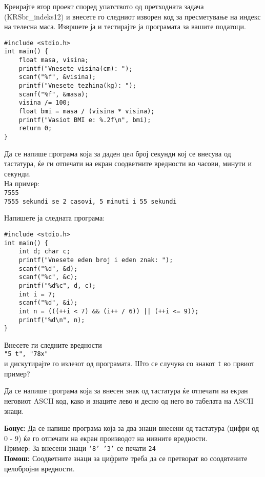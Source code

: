 \documentclass[12pt,a4paper]{exam}
\begin{document}
\begin{questions}
\question
Креирајте втор проект според упатството од претходната задача (KRSbr\_indeks12) и внесете го следниот изворен код за пресметување на индекс на телесна маса. Извршете ја и тестирајте ја програмата за вашите податоци.
\begin{lstlisting}
#include <stdio.h>
int main() {
    float masa, visina;
    printf("Vnesete visina(cm): ");
    scanf("%f", &visina);
    printf("Vnesete tezhina(kg): ");
    scanf("%f", &masa);
    visina /= 100;
    float bmi = masa / (visina * visina);
    printf("Vasiot BMI e: %.2f\n", bmi);
    return 0;
}
\end{lstlisting}

\question
Да се напише програма која за даден цел број секунди кој се внесува од тастатура, ќе ги отпечати на екран соодветните вредности во часови, минути и секунди.
\\На пример:\\
\texttt{7555}\\
\texttt{7555 sekundi se 2 casovi, 5 minuti i 55 sekundi}

\question
Напишете ја следната програма:
\begin{lstlisting}
#include <stdio.h>
int main() {
    int d; char c;
    printf("Vnesete eden broj i eden znak: ");
    scanf("%d", &d);
    scanf("%c", &c);
    printf("%d%c", d, c);
    int i = 7;
    scanf("%d", &i);
    int n = (((++i < 7) && (i++ / 6)) || (++i <= 9));
    printf("%d\n", n);
}
\end{lstlisting}
Внесете ги следните вредности\\
\texttt{"5 t", "78x"}\\
и дискутирајте го излезот од програмата. Што се случува со знакот \texttt{t} во првиот пример?

\question
Да се напише програма која за внесен знак од тастатура ќе отпечати на екран неговиот ASCII код, како и знаците лево и десно од него во табелата на ASCII знаци.

\question
\textbf{Бонус:} Да се напише програма која за два знаци внесени од тастатура (цифри од 0 - 9) ќе го отпечати на екран производот на нивните вредности.\\
Пример:
За внесени знаци \texttt{'8' '3'} се печати \texttt{24}\\
\textbf{Помош:} Соодветните знаци за цифрите треба да се претворат во соодвтените целобројни вредности.

\end{questions}
\end{document}
